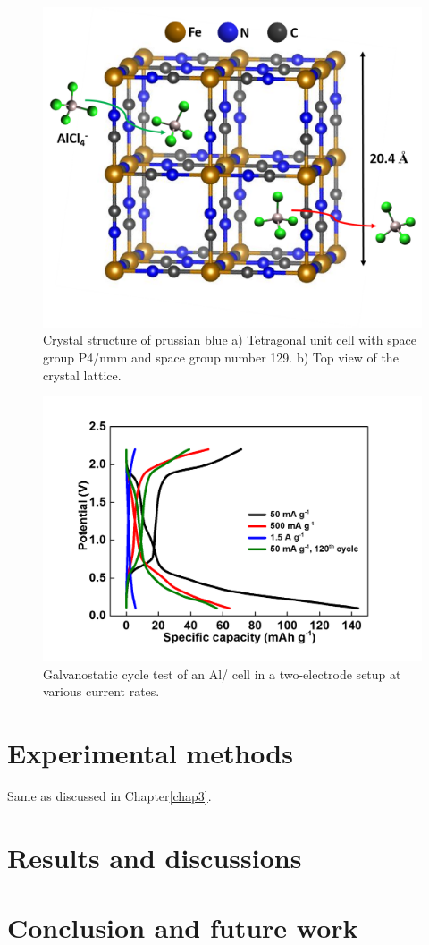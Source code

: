  \begin{figure}[tbh!]
  \centering
  \includegraphics[width=\textwidth]{Figures/chap6fig/pbcrys}
    \caption{Crystal structure of prussian blue a) Tetragonal unit cell with space group P4/nmm and space group number 129. b) Top view of the crystal lattice.}
  \label{Figures/chap6fig:pbcrys}
\end{figure}
 \begin{figure}[tbh!]
  \centering
  \includegraphics[width=\textwidth]{Figures/chap6fig/pbCDC}
    \caption{Galvanostatic cycle test of an Al/ cell in a two-electrode setup at various current rates.}
  \label{Figures/chap6fig:pbCDC}
\end{figure}

\section{Experimental methods}
Same as discussed in Chapter\ref{chap3}.
\section{Results and discussions}
\section{Conclusion and future work}